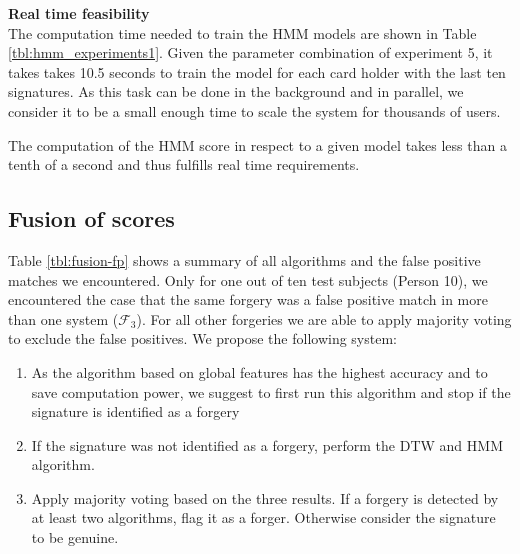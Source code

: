 \documentclass[a4paper, oneside]{csthesis}
\begin{document}
\textbf{Real time feasibility}\\
The computation time needed to train the HMM models are shown in Table \ref{tbl:hmm_experiments1}. Given the parameter combination of experiment 5, it takes takes 10.5 seconds to train the model for each card holder with the last ten signatures. As this task can be done in the background and in parallel, we consider it to be a small enough time to scale the system for thousands of users.

The computation of the HMM score in respect to a given model takes less than a tenth of a second and thus fulfills real time requirements.


\newpage
\subsection{Fusion of scores}

Table \ref{tbl:fusion-fp} shows a summary of all algorithms and the false positive matches we encountered. Only for one out of ten test subjects (Person 10), we encountered the case that the same forgery was a false positive match in more than one system ($\mathcal{F}_3$). For all other forgeries we are able to apply majority voting to exclude the false positives. We propose the following system:

\begin{enumerate}
\item As the algorithm based on global features has the highest accuracy and to save computation power, we suggest to first run this algorithm and stop if the signature is identified as a forgery
\item If the signature was not identified as a forgery, perform the DTW and HMM algorithm.
\item Apply majority voting based on the three results. If a forgery is detected by at least two algorithms, flag it as a forger. Otherwise consider the signature to be genuine.
\end{enumerate}
\end{document}
